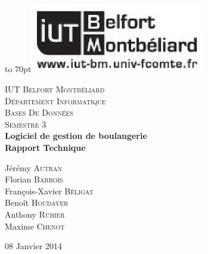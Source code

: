 \documentclass[12pt]{report}
\begin{document}
{
    \begin{titlepage}

    \vbox to 70pt{\hfill\includegraphics[height=3cm]{images/logo-iut.eps}}\
    \begin{center}

    \textsc{\LARGE IUT Belfort Montbéliard}\\[0.7cm]
    \textsc{\LARGE Département Informatique}\\[1.0cm]
    \textsc{\Large Bases De Données}\\[0.5cm]
    \textsc{\Large Semestre 3}\\[5cm]


    {\huge \bfseries Logiciel de gestion de boulangerie}\\[0.5cm]
    {\huge \bfseries Rapport Technique}\\[5cm]

    \begin{large}
    Jérémy \textsc{Autran}\\[0.3em]
    Florian \textsc{Barrois}\\[0.3em]
    François-Xavier \textsc{Béligat}\\[0.3em]
    Benoît \textsc{Houdayer}\\[0.3em]
    Anthony \textsc{Ruhier}\\[0.3em]
    Maxime \textsc{Chenot}\\[0.3em]

    \end{large}

    \vfill

    {\large 08 Janvier 2014}

    \end{center}
    \end{titlepage}
    }

    {\clearpage\mbox{}\thispagestyle{empty}\clearpage}
    \setcounter{page}{1}
    {\large{}}


    
    
    
    
%    



    \tableofcontents

\end{document}
